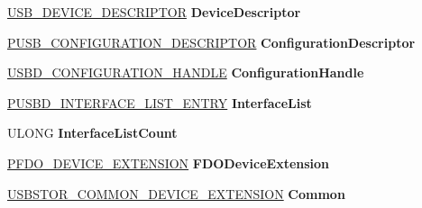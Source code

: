 \begin{DoxyCompactItemize}
\hyperlink{struct___u_s_b___d_e_v_i_c_e___d_e_s_c_r_i_p_t_o_r}{U\+S\+B\+\_\+\+D\+E\+V\+I\+C\+E\+\_\+\+D\+E\+S\+C\+R\+I\+P\+T\+OR} {\bfseries Device\+Descriptor}
\item 
\mbox{\label{struct_p_d_o___d_e_v_i_c_e___e_x_t_e_n_s_i_o_n_aad09b952706627648c1c89f1c3d9ff2b}} 
\hyperlink{struct___u_s_b___c_o_n_f_i_g_u_r_a_t_i_o_n___d_e_s_c_r_i_p_t_o_r}{P\+U\+S\+B\+\_\+\+C\+O\+N\+F\+I\+G\+U\+R\+A\+T\+I\+O\+N\+\_\+\+D\+E\+S\+C\+R\+I\+P\+T\+OR} {\bfseries Configuration\+Descriptor}
\item 
\mbox{\label{struct_p_d_o___d_e_v_i_c_e___e_x_t_e_n_s_i_o_n_ad3581a62f2670e97c9b2ebbfb5c30a79}} 
\hyperlink{interfacevoid}{U\+S\+B\+D\+\_\+\+C\+O\+N\+F\+I\+G\+U\+R\+A\+T\+I\+O\+N\+\_\+\+H\+A\+N\+D\+LE} {\bfseries Configuration\+Handle}
\item 
\mbox{\label{struct_p_d_o___d_e_v_i_c_e___e_x_t_e_n_s_i_o_n_a6103c5747bf449d3d1be7b28bedad200}} 
\hyperlink{struct___u_s_b_d___i_n_t_e_r_f_a_c_e___l_i_s_t___e_n_t_r_y}{P\+U\+S\+B\+D\+\_\+\+I\+N\+T\+E\+R\+F\+A\+C\+E\+\_\+\+L\+I\+S\+T\+\_\+\+E\+N\+T\+RY} {\bfseries Interface\+List}
\item 
\mbox{\label{struct_p_d_o___d_e_v_i_c_e___e_x_t_e_n_s_i_o_n_a229e034c78af6530b205b6929d6a388b}} 
U\+L\+O\+NG {\bfseries Interface\+List\+Count}
\item 
\mbox{\label{struct_p_d_o___d_e_v_i_c_e___e_x_t_e_n_s_i_o_n_a58f82e28d5a56ab4b406171cb229c915}} 
\hyperlink{struct___f_d_o___d_e_v_i_c_e___e_x_t_e_n_s_i_o_n}{P\+F\+D\+O\+\_\+\+D\+E\+V\+I\+C\+E\+\_\+\+E\+X\+T\+E\+N\+S\+I\+ON} {\bfseries F\+D\+O\+Device\+Extension}
\item 
\mbox{\label{struct_p_d_o___d_e_v_i_c_e___e_x_t_e_n_s_i_o_n_ac388b60455b90706da11666cfebfa355}} 
\hyperlink{struct_____c_o_m_m_o_n___d_e_v_i_c_e___e_x_t_e_n_s_i_o_n____}{U\+S\+B\+S\+T\+O\+R\+\_\+\+C\+O\+M\+M\+O\+N\+\_\+\+D\+E\+V\+I\+C\+E\+\_\+\+E\+X\+T\+E\+N\+S\+I\+ON} {\bfseries Common}
\item 
\mbox{\label{struct_p_d_o___d_e_v_i_c_e___e_x_t_e_n_s_i_o_n_a452963f645efa3a279f535eefad4e5d7}} 

\end{DoxyCompactItemize}
